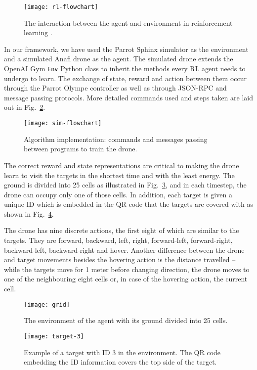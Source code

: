\documentclass[../main.tex]{subfiles}
\begin{document}
\begin{figure}[!t]
	\centering
	\texttt{[image: rl-flowchart]}
	\caption{The interaction between the agent and environment
		in reinforcement learning \cite{Sut20}.}
	\label{fig:rl}
\end{figure}

In our framework, we have used the Parrot Sphinx simulator
as the environment and a simulated Anafi drone as the agent.
The simulated drone extends the OpenAI Gym \texttt{Env} 
Python class
to inherit the methods every RL agent
needs to undergo to learn.
The exchange of state, reward and action between them 
occur through the Parrot Olympe controller as well as
through JSON-RPC and message passing protocols.
More detailed commands used and steps taken are laid out 
in Fig.~\ref{fig:flowchart}.

\begin{figure}[!t]
	\centering
	\texttt{[image: sim-flowchart]}
	\caption{Algorithm implementation: commands and messages passing
		between programs to train the drone.}
	\label{fig:flowchart}
\end{figure}

The correct reward and state representations are critical
to making the drone learn to visit the targets in the shortest
time and with the least energy.
The ground is divided into 25 cells as illustrated in 
Fig.~\ref{fig:grid}, and in each timestep,
the drone can occupy only one of those cells.
In addition, each target is given a unique ID which 
is embedded in the QR code that the targets are covered with
as shown in Fig.~\ref{fig:target}.

The drone has nine discrete actions, the first eight of which
are similar to the targets.
They are forward, backward, left, right,
forward-left, forward-right, backward-left, backward-right
and hover. 
Another difference between the drone and target movements 
besides the hovering action  
is the distance travelled -- while the targets move for 
1 meter before changing direction, the drone moves to 
one of the neighbouring eight cells or,
in case of the hovering action, the current cell.

\begin{figure}[!t]
	\centering
	\texttt{[image: grid]}
	\caption{The environment of the agent with its ground
		divided into 25 cells.}
	\label{fig:grid}
\end{figure}

\begin{figure}[!t]
	\centering
	\texttt{[image: target-3]}
	\caption{Example of a target with ID 3 in the environment. The QR code
		embedding the ID information covers the top side of the target.}
	\label{fig:target}
\end{figure}
\end{document}
